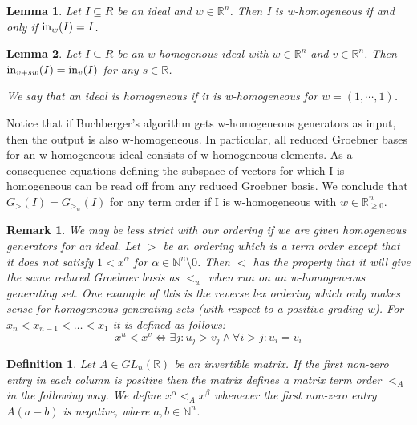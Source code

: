 \documentclass[12pt,a4paper]{report}
\newtheorem{definition}{Definition}
\newtheorem{lemma}{Lemma}
\newtheorem{remark}{Remark}
\begin{document}
\begin{lemma}
Let $I \subseteq R$ be an ideal and $w \in \mathbb R^{n}$. Then I is w-homogeneous if and only if $\operatorname{in}_{w} (I) = I$.
\end{lemma}

\begin{lemma}
Let $I \subseteq R$ be an w-homogenous ideal with $w \in \mathbb R^{n}$ and $v \in \mathbb R^{n}$. Then $\operatorname{in}_{v+sw} (I) = \operatorname{in}_{v} (I)$ for any $s \in \mathbb R$.

We say that an ideal is homogeneous if it is w-homogeneous for $w = (1, \cdots, 1)$.
\end{lemma}

Notice that if Buchberger's algorithm gets w-homogeneous generators as input, then the output is also w-homogeneous. In particular, all reduced Groebner bases for an w-homogeneous ideal consists of w-homogeneous elements. As a consequence equations defining the subspace of vectors for which I is homogeneous can be read off from any reduced Groebner basis. We conclude that $G_{>} (I) = G_{{>}_{w}} (I)$ for any term order if I is w-homogeneous with $w \in \mathbb R_{\geq 0}^{n}$.

\begin{remark}
We may be less strict with our ordering if we are given homogeneous generators for an ideal. Let $>$ be an ordering which is a term order except that it does not satisfy $1 < x^{\alpha}$ for $\alpha \in \mathbb N^{n} \setminus {0}$. Then $<$ has the property that it will give the same reduced Groebner basis as $<_{w}$ when run on an w-homogeneous generating set. One example of this is the reverse lex ordering which only makes sense for homogeneous generating sets (with respect to a positive grading w). For $x_{n} < x_{n-1} < \ldots < x_{1}$ it is defined as follows:
\begin{equation*}
    x^{u} < x^{v} \Leftrightarrow \exists j: u_{j} > v_{j} \wedge \forall i > j: u_{i} = v_{i}
\end{equation*}
\end{remark}

\begin{definition}
Let $A \in GL_{n} (\mathbb R)$ be an invertible matrix. If the first non-zero entry in each column is positive then the matrix defines a matrix term order $<_{A}$ in the following way. We define $x^{\alpha} <_{A} x^{\beta}$ whenever the first non-zero entry $A(a-b)$ is negative, where $a, b \in \mathbb N^{n}$.
\end{definition}
\end{document}
